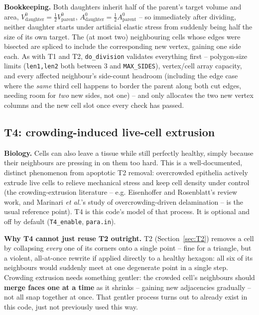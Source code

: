 \documentclass[11pt,a4paper]{report}
\begin{document}
\textbf{Bookkeeping.} Both daughters inherit half of the parent's
target volume and area, $V^0_{\text{daughter}} = \tfrac12 V^0_{\text{parent}}$,
$A^0_{\text{daughter}} = \tfrac12 A^0_{\text{parent}}$ -- so immediately
after dividing, neither daughter starts under artificial elastic
stress from suddenly being half the size of its own target. The (at
most two) neighbouring cells whose edges were bisected are spliced to
include the corresponding new vertex, gaining one side each. As with
T1 and T2, \texttt{do\_division} validates everything first --
polygon-size limits (\texttt{len1,len2} both between 3 and
\texttt{MAX\_SIDES}), vertex/cell array capacity, and every affected
neighbour's side-count headroom (including the edge case where the
\emph{same} third cell happens to border the parent along both cut
edges, needing room for \emph{two} new sides, not one) -- and only
allocates the two new vertex columns and the new cell slot once every
check has passed.

\subsection{T4: crowding-induced live-cell extrusion}
\label{sec:T4}

\textbf{Biology.} Cells can also leave a tissue while still perfectly
healthy, simply because their neighbours are pressing in on them too
hard. This is a well-documented, distinct phenomenon from apoptotic T2
removal: overcrowded epithelia actively extrude live cells to relieve
mechanical stress and keep cell density under control (the
crowding-extrusion literature -- e.g. Eisenhoffer and Rosenblatt's
review work, and Marinari \emph{et al.}'s study of overcrowding-driven
delamination -- is the usual reference point). T4 is this code's model
of that process. It is optional and off by default
(\texttt{T4\_enable}, \texttt{para.in}).

\textbf{Why T4 cannot just reuse T2 outright.} T2
(Section~\ref{sec:T2}) removes a cell by collapsing \emph{every} one of
its corners onto a single point -- fine for a triangle, but a violent,
all-at-once rewrite if applied directly to a healthy hexagon: all six
of its neighbours would suddenly meet at one degenerate point in a
single step. Crowding extrusion needs something gentler: the crowded
cell's neighbours should \textbf{merge faces one at a time} as it
shrinks -- gaining new adjacencies gradually -- not all snap together
at once. That gentler process turns out to already exist in this
code, just not previously used this way.
\end{document}
